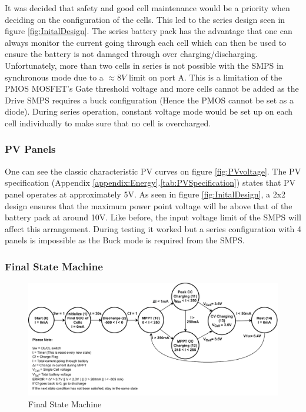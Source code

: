 \documentclass[10pt,twoside]{article}
\begin{document}
It was decided that safety and good cell maintenance would be a priority when deciding on the configuration of the cells. This led to the series design seen in figure \ref{fig:InitalDesign}. The series battery pack has the advantage that one can always monitor the current going through each cell which can then be used to ensure the battery is not damaged through over charging/discharging. Unfortunately, more than two cells in series is not possible with the SMPS in synchronous mode due to a $\approx 8V$ limit on port A. This is a limitation of the PMOS MOSFET's Gate threshold voltage and more cells cannot be added as the Drive SMPS requires a buck configuration (Hence the PMOS cannot be set as a diode). During series operation, constant voltage mode would be set up on each cell individually to make sure that no cell is overcharged. 

\subsubsection{PV Panels}

One can see the classic characteristic PV curves on figure \ref{fig:PVvoltage}. The PV specification (Appendix \ref{appendix:Energy}.\ref{tab:PVSpecification}) states that PV panel operates at approximately 5V. As seen in figure \ref{fig:InitalDesign}, a 2x2 design ensures that the maximum power point voltage will be above that of the battery pack at around 10V. Like before, the input voltage limit of the SMPS will affect this arrangement. During testing it worked but a series configuration with 4 panels is impossible as the Buck mode is required from the SMPS.

\subsubsection{Final State Machine}

\begin{figure}[hbt]
    \centering
    \includegraphics[scale = 0.8]{Final (3).pdf}
    \caption{Final State Machine}
    \label{fig:FinalState}
\end{figure}
\end{document}
